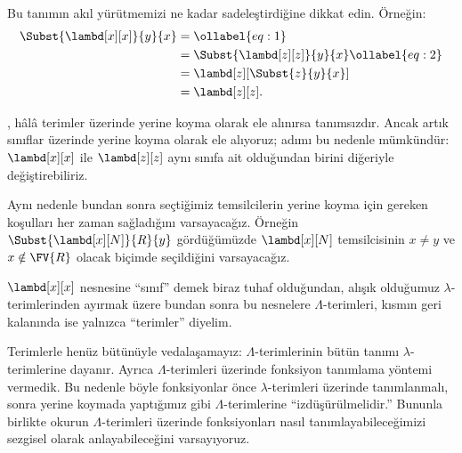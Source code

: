 \documentclass[../../../include/open-logic-section]{subfiles}
\begin{document}
Bu tanımın akıl yürütmemizi ne kadar sadeleştirdiğine dikkat edin. Örneğin:
\begin{align}
  \Subst{\lambd[x][x]}{y}{x} & =\ollabel{eq:1}\\
  &= \Subst{\lambd[z][z]}{y}{x} \ollabel{eq:2}\\
  &= \lambd[z][\Subst{z}{y}{x}] \\
  &= \lambd[z][z].
\end{align}

, hâlâ terimler üzerinde yerine koyma olarak ele alınırsa
tanımsızdır. Ancak artık sınıflar üzerinde yerine koyma olarak ele alıyoruz;
 adımı bu nedenle mümkündür: $\lambd[x][x]$ ile
$\lambd[z][z]$ aynı sınıfa ait olduğundan birini diğeriyle değiştirebiliriz.

Aynı nedenle bundan sonra seçtiğimiz temsilcilerin yerine koyma için gereken
koşulları her zaman sağladığını varsayacağız. Örneğin
$\Subst{\lambd[x][N]}{R}{y}$ gördüğümüzde $\lambd[x][N]$ temsilcisinin
$x\neq y$ ve $x\notin\FV{R}$ olacak biçimde seçildiğini varsayacağız.

$\lambd[x][x]$ nesnesine ``sınıf'' demek biraz tuhaf olduğundan, alışık
olduğumuz $\lambda$-terimlerinden ayırmak üzere bundan sonra bu nesnelere
$\Lambda$-terimleri, kısmın geri kalanında ise yalnızca ``terimler'' diyelim.

\begin{editorial}
  Terimlerle henüz bütünüyle vedalaşamayız: $\Lambda$-terimlerinin bütün
  tanımı $\lambda$-terimlerine dayanır. Ayrıca $\Lambda$-terimleri üzerinde
  fonksiyon tanımlama yöntemi vermedik. Bu nedenle böyle fonksiyonlar önce
  $\lambda$-terimleri üzerinde tanımlanmalı, sonra yerine koymada yaptığımız
  gibi $\Lambda$-terimlerine ``izdüşürülmelidir.'' Bununla birlikte okurun
  $\Lambda$-terimleri üzerinde fonksiyonları nasıl tanımlayabileceğimizi
  sezgisel olarak anlayabileceğini varsayıyoruz.
\end{editorial}
\end{document}
